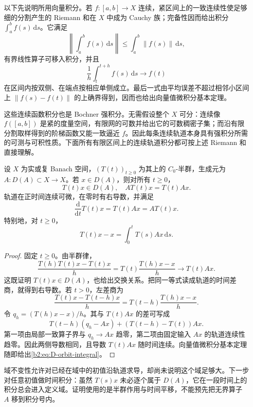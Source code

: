 \ProseParagraphBreak

以下先说明所用向量积分。若 \(f:[a,b]\to X\) 连续，紧区间上的一致连续性使足够细的分割产生的 Riemann 和在 \(X\) 中成为 Cauchy 族；完备性因而给出积分 \(\int_a^bf(s)\,\mathrm ds\)。它满足
\[
 \left\|\int_a^bf(s)\,\mathrm ds\right\|
 \leq\int_a^b\|f(s)\|\,\mathrm ds,
\]
有界线性算子可移入积分，并且
\[
 \frac1h\int_t^{t+h}f(s)\,\mathrm ds\longrightarrow f(t)
\]
在区间内按双侧、在端点按相应单侧成立。最后一式由平均误差不超过相邻小区间上 \(\|f(s)-f(t)\|\) 的上确界得到，因而也给出向量值微积分基本定理。

\ProseParagraphBreak

这些连续函数积分也是 Bochner 强积分。无需假设整个 \(X\) 可分：连续像 \(f([a,b])\) 是紧的度量空间，有限网的可数并给出它的可数稠密子集；而沿有限分割取样得到的阶梯函数又能一致逼近 \(f\)。因此每条连续轨道本身具有强积分所需的可测与可积性质。下面所有有限区间上的连续轨道积分都可按上述 Riemann 和直接理解。

\begin{proposition}[定义域不变性与轨道导数]\label{b2:prop:D-generator-orbit}
设 \(X\) 为实或复 Banach 空间，\((T(t))_{t\geq0}\) 为其上的 \(C_0\)-半群，生成元为 \(A:D(A)\subset X\to X\)。若 \(x\in D(A)\)，则对所有 \(t\geq0\)，
\[
 T(t)x\in D(A),\quad AT(t)x=T(t)Ax.
\]
轨道在正时间连续可微，在零时有右导数，并满足
\[
 \frac{\mathrm d}{\mathrm dt}T(t)x=T(t)Ax=AT(t)x.
\]
特别地，对 \(t\geq0\)，
\begin{equation}\label{b2:eq:D-orbit-integral}
 T(t)x-x=\int_0^tT(s)Ax\,\mathrm ds.
\end{equation}
\end{proposition}
\begin{proof}
固定 \(t\geq0\)。由半群律，
\[
 \frac{T(h)T(t)x-T(t)x}{h}
 =T(t)\frac{T(h)x-x}{h}\longrightarrow T(t)Ax.
\]
这既证明 \(T(t)x\in D(A)\)，也给出交换关系。把同一等式读成轨道的时间差商，就得到右导数。若 \(t>0\)，左差商为
\[
 \frac{T(t)x-T(t-h)x}{h}
 =T(t-h)\frac{T(h)x-x}{h}.
\]
令 \(q_h=(T(h)x-x)/h\)。其与 \(T(t)Ax\) 的差可写成
\[
 T(t-h)(q_h-Ax)+(T(t-h)-T(t))Ax.
\]
第一项由局部一致算子界与 \(q_h\to Ax\) 趋零，第二项由固定输入 \(Ax\) 的轨道连续性趋零。因此两侧导数相同，且导数 \(T(t)Ax\) 随时间连续。向量值微积分基本定理随即给出\eqref{b2:eq:D-orbit-integral}。
\end{proof}
域不变性允许对已经在域中的初值沿轨道求导，却尚未说明这个域足够大。下一步对任意初值做时间积分：虽然 \(T(s)x\) 未必逐个属于 \(D(A)\)，它在一段时间上的积分总会进入定义域。证明使用的是半群作用与时间平移，不能预先把无界算子 \(A\) 移到积分号内。

